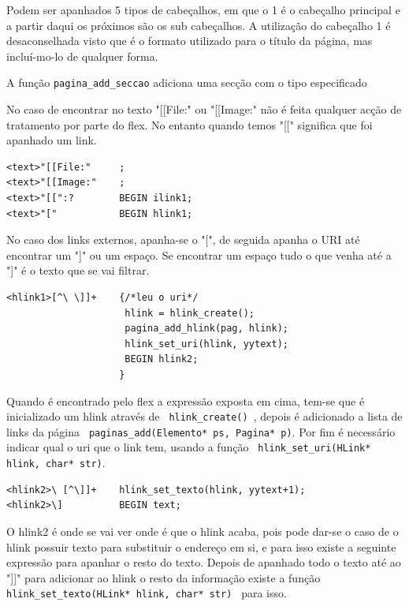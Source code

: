 \documentclass[11pt, a4paper, oneside]{article}
\begin{document}
Podem ser apanhados 5 tipos de cabeçalhos, em que o 1 é o cabeçalho principal e a partir daqui os próximos são os sub cabeçalhos. A utilização do cabeçalho 1 é desaconselhada visto que é o formato utilizado para o título da página, mas incluí-mo-lo de qualquer forma.

A função \texttt{pagina_add_seccao} adiciona uma secção com o tipo especificado 











No caso de encontrar no texto "[[File:" ou "[[Image:" não é feita qualquer acção de tratamento por parte do flex. No entanto quando temos "[[" significa que foi apanhado um link.

\begin{verbatim}
<text>"[[File:"     ;
<text>"[[Image:"    ;
<text>"[[":?        BEGIN ilink1;
<text>"["           BEGIN hlink1;
\end{verbatim}

No caso dos links externos, apanha-se o "[", de seguida apanha o URI até encontrar um "]" ou um espaço. Se encontrar um espaço tudo o que venha até a "]"  é o texto que se vai filtrar.
\begin{verbatim}
<hlink1>[^\ \]]+    {/*leu o uri*/
                     hlink = hlink_create();
                     pagina_add_hlink(pag, hlink);
                     hlink_set_uri(hlink, yytext);
                     BEGIN hlink2;
                    }
\end{verbatim}

Quando é  encontrado pelo flex a expressão exposta em cima, tem-se que é inicializado um hlink através de \texttt{ hlink\_create() }, depois é adicionado a lista de links da página  \texttt{ paginas\_add(Elemento* ps, Pagina* p)}. Por fim  é necessário indicar qual o uri que o link tem, usando a função  \texttt{ hlink\_set\_uri(HLink* hlink, char* str)}.



\begin{verbatim}
<hlink2>\ [^\]]+    hlink_set_texto(hlink, yytext+1);
<hlink2>\]          BEGIN text;

\end{verbatim}

O hlink2 é onde se vai ver onde é que o hlink acaba, pois pode dar-se o caso de o hlink possuir texto para substituir o endereço em si, e para isso existe a seguinte expressão para apanhar o resto do texto. Depois de apanhado todo o texto até ao "]]" para adicionar ao hlink o resto da informação existe a função \texttt{ hlink\_set\_texto(HLink* hlink, char* str) } para isso.
\end{document}
